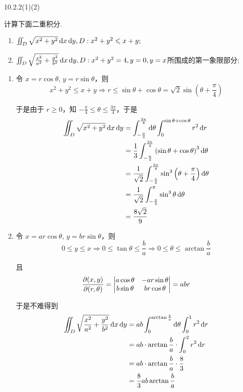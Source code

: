 \begin{exercise}
    {10.2.2(1)(2)}

    计算下面二重积分.
    \begin{enumerate}
        \item $\iint_D \sqrt{x^2+y^2} \operatorname{d\!} x \operatorname{d\!} y, D: x^2+y^2 \leqslant x+y;$
        \item $\iint_D \sqrt{\frac{x^2}{a^2}+\frac{y^2}{b^2}} \operatorname{d\!} x \operatorname{d\!} y, D: x^2+y^2 =4,y=0,y=x$所围成的第一象限部分;
    \end{enumerate}
\end{exercise}

\begin{solution}
    \begin{enumerate}
        \item 令 $x = r\cos\theta$, $y = r\sin\theta$，则
        \[
        x^2 + y^2 \le x + y \Longrightarrow r \le \sin\theta + \cos\theta 
        = \sqrt{2} \sin\left(\theta + \frac{\pi}{4}\right)
        \]
        
        于是由于 $r \ge 0$，知 $-\frac{\pi}{4} \le \theta \le \frac{3\pi}{4}$，于是
        \begin{align*}
        \iint_D \sqrt{x^2 + y^2} \operatorname{d\!} x \operatorname{d\!} y 
        &= \int_{-\frac{\pi}{4}}^{\frac{3\pi}{4}} \operatorname{d\!} \theta \int_0^{\sin\theta + \cos\theta} r^2 \operatorname{d\!} r \\
        &= \frac{1}{3} \int_{-\frac{\pi}{4}}^{\frac{3\pi}{4}} \left( \sin\theta + \cos\theta \right)^3 \operatorname{d\!} \theta \\
        &= \frac{1}{\sqrt{2}} \int_{-\frac{\pi}{4}}^{\frac{3\pi}{4}} \sin^3\left(\theta + \frac{\pi}{4}\right) \operatorname{d\!} \theta \\
        &= \frac{1}{\sqrt{2}} \int_{-\frac{\pi}{4}}^{\pi} \sin^3 \theta \operatorname{d\!} \theta \\
        &= \frac{8\sqrt{2}}{9}
        \end{align*}
        \item 令 $x = ar \cos\theta,\, y = br \sin\theta$，则
        \[
        0 \le y \le x \Longrightarrow 0 \le \tan\theta \le \frac{b}{a} \Longrightarrow 0 \le \theta \le \arctan \frac{b}{a}
        \]
        
        且
        \[
        \pdv{(x, y)}{(r, \theta)} =
        \begin{vmatrix}
        a\cos\theta & -ar\sin\theta \\
        b\sin\theta & br\cos\theta
        \end{vmatrix}
        = abr
        \]
        
        于是不难得到
        \begin{align*}
        \iint_D \sqrt{\frac{x^2}{a^2} + \frac{y^2}{b^2}} \operatorname{d\!} x \operatorname{d\!} y 
        &= ab \int_0^{\arctan \frac{b}{a}} \operatorname{d\!}\theta \int_0^1 r^2 \operatorname{d\!} r \\
        &= ab \cdot \arctan \frac{b}{a} \cdot \int_0^2 r^2 \operatorname{d\!} r \\
        &= ab \cdot \arctan \frac{b}{a} \cdot \frac{8}{3} \\
        &= \frac{8}{3} ab \arctan \frac{b}{a}
        \end{align*}
    \end{enumerate}
\end{solution}


